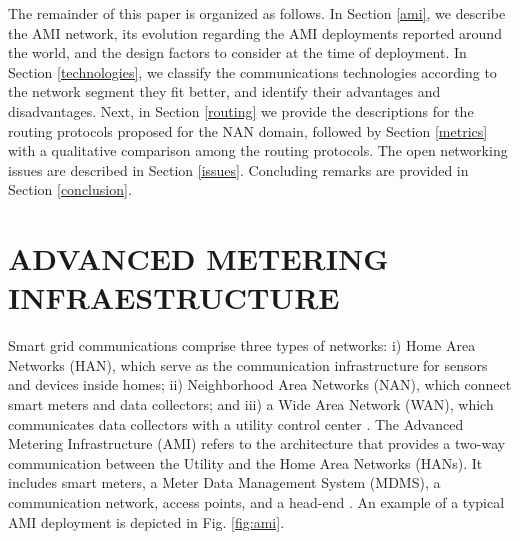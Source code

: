 \documentclass[10pt,twocolumn,twoside,submit]{JCNtran}
\begin{document}

The remainder of this paper is organized as follows. In Section \ref{ami}, we describe the AMI network, its evolution regarding the AMI deployments reported around the world, and the design factors to consider at the time of deployment. In Section \ref{technologies}, we classify the communications technologies according to the network segment they fit better, and identify their advantages and disadvantages. Next, in Section \ref{routing} we provide the descriptions for the routing protocols proposed for the NAN domain, followed by Section \ref{metrics} with a qualitative comparison among the routing protocols. The open networking issues are described in Section \ref{issues}. Concluding remarks are provided in Section \ref{conclusion}.

\vspace{10pt}
\section{\uppercase{Advanced Metering Infraestructure}}
\label{sec:ami}

Smart grid communications comprise three types of networks: i) Home Area Networks (HAN), which serve as the communication infrastructure for sensors and devices inside homes; ii) Neighborhood Area Networks (NAN), which connect smart meters and data collectors; and iii) a Wide Area Network (WAN), which communicates data collectors with a utility control center  \cite{Tang2010}. The Advanced Metering Infrastructure (AMI) refers to the architecture that provides a two-way communication between the Utility and the Home Area Networks (HANs). It includes smart meters, a Meter Data Management System (MDMS), a communication network, access points, and a head-end  \cite{Wang2011b} \cite{Bennett2008}. An example of a typical AMI deployment is depicted in Fig. \ref{fig:ami}.
\end{document}
